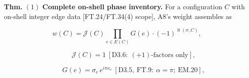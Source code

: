 \begin{theorem}\label{tag:FT-61}
\textbf{Thm.} $(1)$ \textbf{Complete on-shell phase inventory.} For a configuration $C$ with on-shell integer edge data [FT.24/FT.34(4) scope], A8's weight assembles as

\[
w(C)=\mathcal J(C)\prod_{e\in E(C)}G(e)\cdot(-1)^{\aleph(\sigma,C)},
\]

\[
\qquad \mathcal J(C)=1\ [\mathrm{D3.6}:\ (+1)\text{-factors only}],
\]

\[
\qquad G(e)=\sigma_e\,e^{i\pi\kappa_e}\ [\mathrm{D3.5},\ \mathrm{FT.9}:\ \alpha=\pi;\ \mathrm{EM.20}],
\]


\end{theorem}
